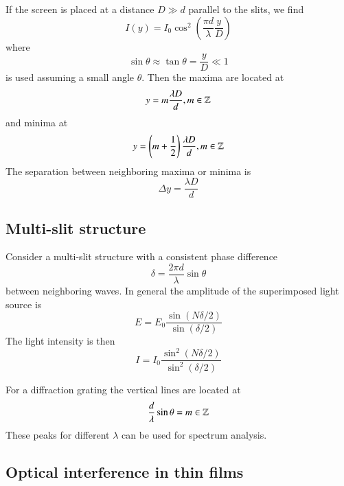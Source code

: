 \documentclass[12pt, a4paper, oneside, openright, titlepage]{book}
\begin{document}
If the screen is placed at a distance $D \gg d$ parallel to the slits, we find
\begin{equation*}
    I(y) = I_0\cos^2\left(\frac{\pi d}{\lambda}\frac{y}{D}\right)
\end{equation*}
where
\begin{equation*}
    \sin\theta \approx \tan\theta = \frac{y}{D}\ll 1
\end{equation*}
is used assuming a small angle $\theta$. Then the maxima are located at 
\begin{equation*}
    y = m\frac{\lambda D}{d}, m \in \mathbb Z
\end{equation*}
and minima at
\begin{equation*}
    y = \left(m+\frac{1}{2}\right)\frac{\lambda D}{d}, m \in \mathbb Z
\end{equation*}
The separation between neighboring maxima or minima is
\begin{equation*}
    \Delta y = \frac{\lambda D}{d}
\end{equation*}


\subsection{Multi-slit structure}


Consider a multi-slit structure with a consistent phase difference
\begin{equation*}
    \delta = \frac{2\pi d}{\lambda}\sin\theta
\end{equation*}
between neighboring waves. In general the amplitude of the superimposed light source is
\begin{equation*}
    E = E_0\frac{\sin(N\delta/2)}{\sin(\delta/2)}
\end{equation*}
The light intensity is then
\begin{equation*}
    I = I_0\frac{\sin^2(N\delta/2)}{\sin^2(\delta/2)}
\end{equation*}

For a diffraction grating the vertical lines are located at
\begin{equation*}
    \frac{d}{\lambda}\sin\theta = m \in \mathbb Z
\end{equation*}
These peaks for different $\lambda$ can be used for spectrum analysis.



\subsection{Optical interference in thin films}
\end{document}
